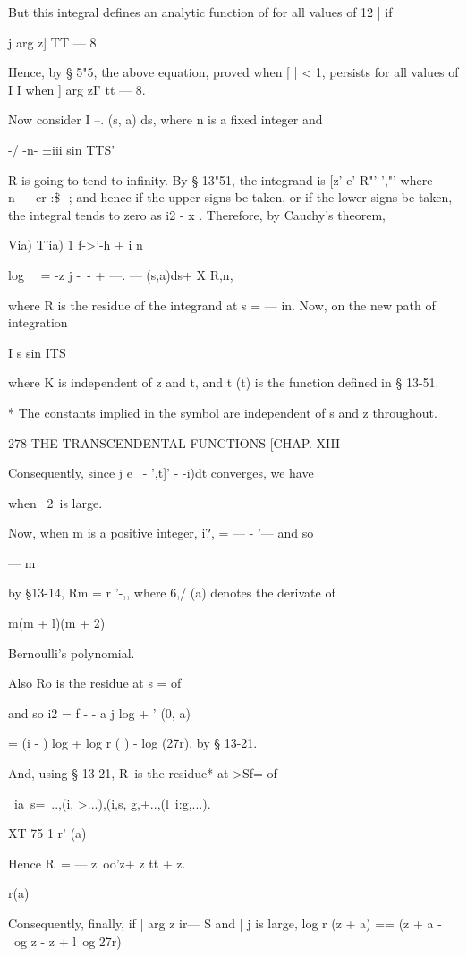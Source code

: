 {{But this integral defines an analytic function of for all values of 12
| if

j arg z] TT — 8.

Hence, by § 5"5, the above equation, proved when [ | < 1, persists for
all values of I I when ] arg zI' tt — 8.

Now consider I --. (s, a) ds, where n is a fixed integer and

-/ -n- ±iii sin TTS'

R is going to tend to infinity. By § 13"51, the integrand is [z' e'
R"' ',"' where — n - - cr :\$ -; and hence if the upper signs be
taken, or if the lower signs be taken, the integral tends to zero as
i2 - x . Therefore, by Cauchy's theorem,

Via) T'ia) 1 f->'-h + i n

log \ \ = -z j -~- + —. — (s,a)ds+ X R,n,

where R is the residue of the integrand at s = — in. Now, on the new
path of integration

I s sin ITS \

where K is independent of z and t, and t (t) is the function defined
in § 13-51.

* The constants implied in the symbol are independent of s and z
throughout.

278 THE TRANSCENDENTAL FUNCTIONS [CHAP. XIII

Consequently, since j e~ - ',t]' - -i)dt converges, we have

when \ 2\ is large.

Now, when m is a positive integer, i?, = — - '— and so

— m

by §13-14, Rm = r '-,, where 6,/ (a) denotes the derivate of

m(m + l)(m + 2)

Bernoulli's polynomial.

Also Ro is the residue at s = of

and so i2 = f - - a j log + ' (0, a)

= (i - ) log + log r ( ) - log (27r), by § 13-21.

And, using § 13-21, R\, is the residue* at >Sf= of

\ ia\ s=\ ..,(i, >...),(i,s, g,+..,(l\ i:g,...).

XT 75 1 r' (a)

Hence R\ = — z\ oo'z+ z tt + z.

r(a)

Consequently, finally, if | arg z ir— S and | j is large, log r (z +
a) == (z + a -~ \ og z - z + l\ og 27r)

}}
